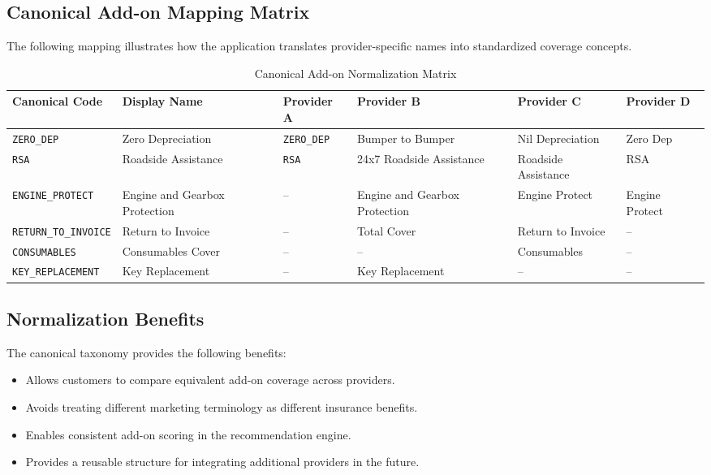 \documentclass[11pt,a4paper]{article}
\begin{document}
\subsection{Canonical Add-on Mapping Matrix}

The following mapping illustrates how the application translates
provider-specific names into standardized coverage concepts.

\begin{table}[H]
\centering
\small
\caption{Canonical Add-on Normalization Matrix}
\begin{tabularx}{\textwidth}{L{2.4cm}L{3.0cm}YYYY}
\toprule
\textbf{Canonical Code} &
\textbf{Display Name} &
\textbf{Provider A} &
\textbf{Provider B} &
\textbf{Provider C} &
\textbf{Provider D} \\
\midrule

\texttt{ZERO\_DEP} &
Zero Depreciation &
\texttt{ZERO\_DEP} &
Bumper to Bumper &
Nil Depreciation &
Zero Dep \\

\texttt{RSA} &
Roadside Assistance &
\texttt{RSA} &
24x7 Roadside Assistance &
Roadside Assistance &
RSA \\

\texttt{ENGINE\_PROTECT} &
Engine and Gearbox Protection &
-- &
Engine and Gearbox Protection &
Engine Protect &
Engine Protect \\

\texttt{RETURN\_TO\_INVOICE} &
Return to Invoice &
-- &
Total Cover &
Return to Invoice &
-- \\

\texttt{CONSUMABLES} &
Consumables Cover &
-- &
-- &
Consumables &
-- \\

\texttt{KEY\_REPLACEMENT} &
Key Replacement &
-- &
Key Replacement &
-- &
-- \\

\bottomrule
\end{tabularx}
\end{table}

\subsection{Normalization Benefits}

The canonical taxonomy provides the following benefits:

\begin{itemize}

    \item Allows customers to compare equivalent add-on
    coverage across providers.

    \item Avoids treating different marketing terminology
    as different insurance benefits.

    \item Enables consistent add-on scoring in the
    recommendation engine.

    \item Provides a reusable structure for integrating
    additional providers in the future.

\end{itemize}
\end{document}
